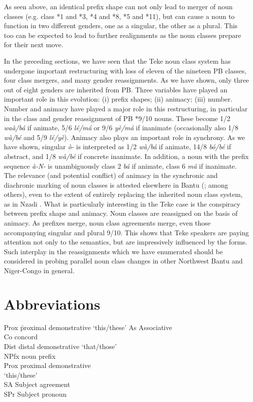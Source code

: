 \documentclass[output=paper,,modfonts,nonflat]{langsci/langscibook}
\begin{document}
As seen above, an identical prefix shape can not only lead to merger of noun classes (e.g. class *1 and *3, *4 and *8, *5 and *11), but can cause a noun to function in two different genders, one as a singular, the other as a plural. This too can be expected to lead to further realignments as the noun classes prepare for their next move.

In the preceding sections, we have seen that the Teke noun class system has undergone important restructuring with loss of eleven of the nineteen PB classes, four class mergers, and many gender reassignments. As we have shown, only three out of eight genders are inherited from PB. Three variables have played an important role in this evolution: (i) prefix shapes; (ii) animacy; (iii) number. Number and animacy have played a major role in this restructuring, in particular in the class and gender reassignment of PB *9/10 nouns. These become 1/2 \textit{waà/bá} if animate, 5/6 \textit{lé/má} or 9/6 \textit{yè/má} if inanimate (occasionally also 1/8 \textit{wà/bé} and 5/9 \textit{lé/yè}). Animacy also plays an important role in synchrony. As we have shown, singular \textit{ò-} is interpreted as 1/2 \textit{wà/bá} if animate, 14/8 \textit{bó/bé} if abstract, and 1/8 \textit{wà/bé} if concrete inanimate. In addition, a noun with the prefix sequence \textit{à-N-} is unambiguously class 2 \textit{bá} if animate, class 6 \textit{má} if inanimate. The relevance (and potential conflict) of animacy in the synchronic and diachronic marking of noun classes is attested elsewhere in Bantu (\citealt{Wald1975,Maho1999,Contini2008}; among others), even to the extent of entirely replacing the inherited noun class system, as in Nzadi \citep{Craneetal2011}. What is particularly interesting in the Teke case is the conspiracy between prefix shape and animacy. Noun classes are reassigned on the basis of animacy. As prefixes merge, noun class agreements merge, even those accompanying singular and plural 9/10. This shows that Teke speakers are paying attention not only to the semantics, but are impressively influenced by the forms. Such interplay in the reassignments which we have enumerated should be considered in probing parallel noun class changes in other Northwest Bantu and Niger-Congo in general.

\section*{Abbreviations}
\begin{multicols}{2}
\begin{tabbing}
 Prox\hspace{.5em} \= proximal demonstrative `this/these'\kill
 As \> Associative\\
 Co \> concord\\
 Dist \> distal demonstrative `that/those'\\
 NPfx \> noun prefix\\
 Prox \> proximal demonstrative \\ \> `this/these'\\
 SA \> Subject agreement\\
 SPr \> Subject pronoun
\end{tabbing}
\end{multicols}

{\sloppy\printbibliography[heading=subbibliography,notkeyword=this]}
\end{document}
